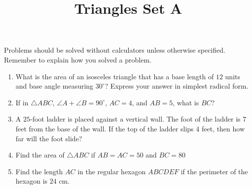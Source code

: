 \documentclass{article}
\title{Triangles Set A}
\date{}
\author{}
\begin{document}
\maketitle
\noindent Problems should be solved without calculators unless otherwise specified.
Remember to explain how you solved a problem.
\begin{multicols}{2}
    \begin{enumerate}
        \item What is the area of an isosceles triangle that has a base length of $12$ units and base angle measuring $30^{\circ}$?
            Express your answer in simplest radical form.
            \vspace{3cm}
        \item If in $\triangle ABC$, $\angle A + \angle B = 90^{\circ}$, $AC = 4$, and $AB = 5$, what is $BC$?
            \vspace{3cm}
        \item A $25$-foot ladder is placed against a vertical wall.
            The foot of the ladder is $7$ feet from the base of the wall.
            If the top of the ladder slips $4$ feet, then how far will the foot slide?
            \vspace{3cm}
        \item Find the area of $\triangle ABC$ if $AB = AC = 50$ and $BC = 80$
            \vspace{3cm}
        \item Find the length $AC$ in the regular hexagon $ABCDEF$ if the perimeter of the hexagon is $24$ cm.
            \vspace{3cm}
    \end{enumerate}
\end{multicols}
\end{document}
